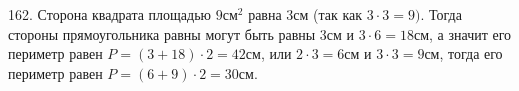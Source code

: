 162. Сторона квадрата площадью $9\text{см}^2$ равна 3см (так как $3\cdot3=9).$ Тогда стороны прямоугольника равны могут быть равны 3см и $3\cdot6=18$см, а значит его периметр равен $P=(3+18)\cdot2=42$см, или $2\cdot3=6$см и $3\cdot3=9$см, тогда его периметр равен $P=(6+9)\cdot2=30$см.\\
